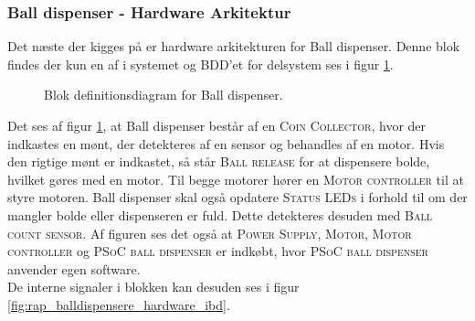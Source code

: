 \documentclass[Rapport/Rapport_main.tex]{subfiles}
\begin{document}
\subsubsection{Ball dispenser - Hardware Arkitektur}
Det næste der kigges på er hardware arkitekturen for Ball dispenser. Denne blok findes der kun en af i systemet og BDD'et for delsystem ses i figur \ref{fig:rap_balldispenser_hardware_bdd}.
\begin{figure}[H]
    \centering
    \caption{Blok definitionsdiagram for Ball dispenser.}
    \label{fig:rap_balldispenser_hardware_bdd}
\end{figure}
Det ses af figur \ref{fig:rap_balldispenser_hardware_bdd}, at Ball dispenser består af en \textsc{Coin Collector}, hvor der indkastes en mønt, der detekteres af en sensor og behandles af en motor. Hvis den rigtige mønt er indkastet, så står \textsc{Ball release} for at dispensere bolde, hvilket gøres med en motor. Til begge motorer hører en \textsc{Motor controller} til at styre motoren. Ball dispenser skal også opdatere \textsc{Status LEDs} i forhold til om der mangler bolde eller dispenseren er fuld. Dette detekteres desuden med \textsc{Ball count sensor}. Af figuren ses det også at \textsc{Power Supply}, \textsc{Motor}, \textsc{Motor controller} og \textsc{PSoC ball dispenser} er indkøbt, hvor \textsc{PSoC ball dispenser} anvender egen software.\\
De interne signaler i blokken kan desuden ses i figur \ref{fig:rap_balldispensere_hardware_ibd}.
\end{document}
